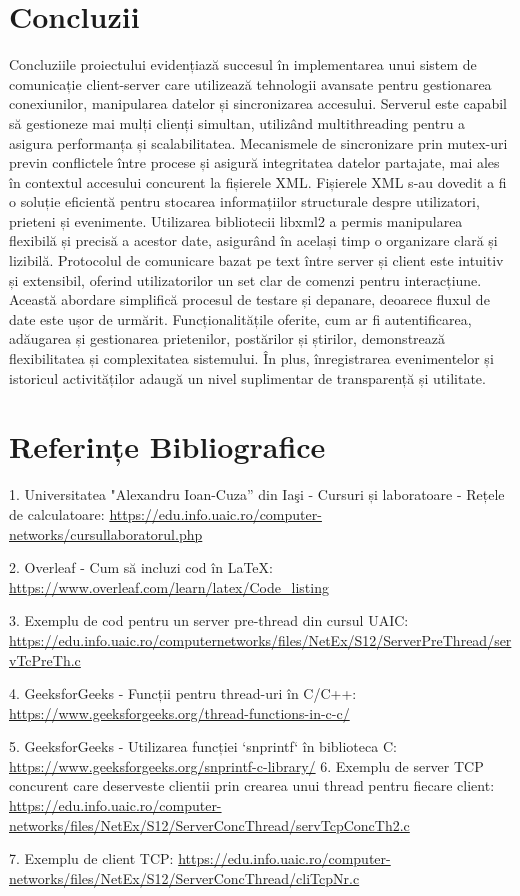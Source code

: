 \documentclass[12pt, a4paper]{article}
\begin{document}
\section{Concluzii}

Concluziile proiectului evidențiază succesul în implementarea unui sistem de comunicație client-server care utilizează tehnologii avansate pentru gestionarea conexiunilor, manipularea datelor și sincronizarea accesului.
Serverul este capabil să gestioneze mai mulți clienți simultan, utilizând multithreading pentru a asigura performanța și scalabilitatea. Mecanismele de sincronizare prin mutex-uri previn conflictele între procese și asigură integritatea datelor partajate, mai ales în contextul accesului concurent la fișierele XML.
Fișierele XML s-au dovedit a fi o soluție eficientă pentru stocarea informațiilor structurale despre utilizatori, prieteni și evenimente. Utilizarea bibliotecii libxml2 a permis manipularea flexibilă și precisă a acestor date, asigurând în același timp o organizare clară și lizibilă.
Protocolul de comunicare bazat pe text între server și client este intuitiv și extensibil, oferind utilizatorilor un set clar de comenzi pentru interacțiune. Această abordare simplifică procesul de testare și depanare, deoarece fluxul de date este ușor de urmărit.
Funcționalitățile oferite, cum ar fi autentificarea, adăugarea și gestionarea prietenilor, postărilor și știrilor, demonstrează flexibilitatea și complexitatea sistemului. În plus, înregistrarea evenimentelor și istoricul activităților adaugă un nivel suplimentar de transparență și utilitate.
\section{Referințe Bibliografice}


1. Universitatea "Alexandru Ioan-Cuza” din Iaşi - Cursuri și laboratoare - Rețele de calculatoare:  
   \url{https://edu.info.uaic.ro/computer-networks/cursullaboratorul.php}

2. Overleaf - Cum să incluzi cod în LaTeX:  
   \url{https://www.overleaf.com/learn/latex/Code_listing}

3. Exemplu de cod pentru un server pre-thread din cursul UAIC:  
   \url{https://edu.info.uaic.ro/computernetworks/files/NetEx/S12/ServerPreThread/servTcPreTh.c}

4. GeeksforGeeks - Funcții pentru thread-uri în C/C++:  
   \url{https://www.geeksforgeeks.org/thread-functions-in-c-c/}

5. GeeksforGeeks - Utilizarea funcției `snprintf` în biblioteca C:  
   \url{https://www.geeksforgeeks.org/snprintf-c-library/}
6. Exemplu de server TCP concurent care deserveste clientii prin crearea unui thread pentru fiecare client:
    \url{https://edu.info.uaic.ro/computer-networks/files/NetEx/S12/ServerConcThread/servTcpConcTh2.c}
    
7. Exemplu de client TCP:
    \url{https://edu.info.uaic.ro/computer-networks/files/NetEx/S12/ServerConcThread/cliTcpNr.c}
\end{document}
